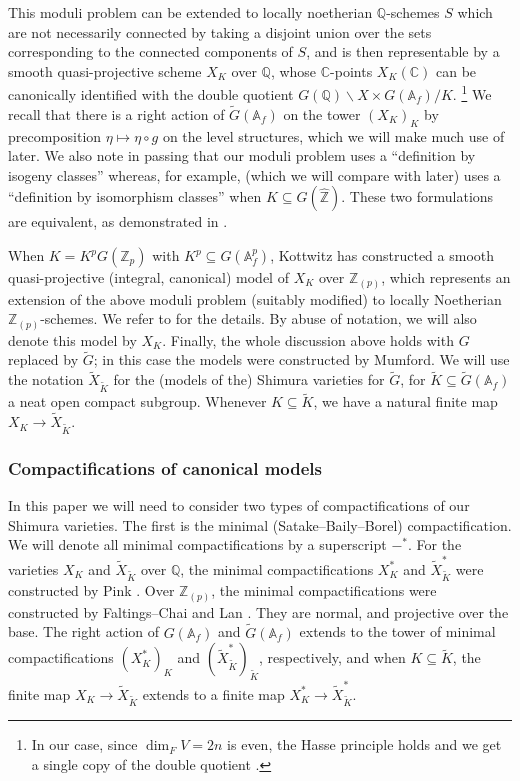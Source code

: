 \documentclass{amsart}
\theoremstyle{remark}
\numberwithin{equation}{subsection}
\newcommand{\A}{\AA}
\newcommand{\Q}{\QQ}
\newcommand{\Z}{\ZZ}
\renewcommand{\AA}{{\mathbb A}}
\newcommand{\CC}{{\mathbb C}}
\newcommand{\QQ}{{\mathbb Q}}
\newcommand{\ZZ}{{\mathbb Z}}
\newcommand{\Zp}{\Z_p}
\newcommand{\tG}{\widetilde{G}}
\newcommand{\tK}{{\widetilde{K}}}
\newcommand{\wt}{\widetilde}
\newcommand{\sub}{\subseteq}
\renewcommand{\(}{\left(}
\renewcommand{\)}{\right)}
\begin{document}
\medskip

This moduli problem can be extended to locally noetherian $\Q$-schemes $S$ which are not necessarily connected by taking a disjoint union over the sets corresponding to the connected components of $S$, and is then representable by a smooth quasi-projective scheme $X_K$ over $\QQ$, whose $\CC$-points $X_K(\CC)$ can be canonically identified with the double quotient $G(\QQ) \backslash X \times G(\AA_f) / K$.%
\footnote{In our case, since $\dim_F V =2n$ is even, the Hasse principle holds and we get a single copy of the
double quotient \cite[\S 7]{kottwitz-shimura}.} We recall that there is a right action of $\tG(\A_f)$ on the tower $(X_K)_K$
by precomposition $\eta\mapsto \eta\circ g$ on the level structures, which we will make much use of later. We also note in passing that our moduli problem uses a ``definition by isogeny classes'' \cite[\S 1.4.2]{lan-thesis} whereas, for example, \cite{scholze-galois} (which we will compare with later) uses a ``definition by isomorphism classes'' \cite[\S 1.4.1]{lan-thesis} when $K \sub G(\widehat{\Z})$. These two formulations are equivalent, as demonstrated in \cite[\S 1.4.3]{lan-thesis}.

\medskip 

When $K=K^p G(\Zp)$ with $K^p \sub G(\A_f^p)$, Kottwitz has constructed a smooth quasi-projective (integral, canonical) model of $X_K$ over $\Z_{(p)}$, which represents an extension of the above moduli problem (suitably modified) to locally Noetherian $\Z_{(p)}$-schemes. We refer to \cite[\S 5]{kottwitz-shimura} for the details. By abuse of notation, we will also denote this model by $X_K$. Finally, the whole discussion above holds with $G$ replaced by $\tG$; in this case the models were constructed by Mumford. We will use the notation $\wt{X}_{\tK}$ for the (models of the) Shimura varieties for $\tG$, for $\tK \sub \tG(\A_f)$ a neat open compact subgroup. Whenever $K \sub \tK$, we have a natural finite map $X_K \to \wt{X}_{\tK}$.

\subsubsection{Compactifications of canonical models}
In this paper we will need to consider two types of compactifications of our Shimura varieties. The first is the minimal (Satake--Baily--Borel) compactification. We will denote all minimal compactifications by a superscript $-^\ast$. For the varieties $X_K$ and $\wt{X}_{\tK}$ over $\Q$, the minimal compactifications $X_K^\ast$ and $\wt{X}_{\tK}^\ast$ were constructed by Pink \cite{pink-thesis}. Over $\Z_{(p)}$, the minimal compactifications were constructed by Faltings--Chai \cite{faltings-chai} and Lan \cite{lan-thesis}. They are normal, and projective over the base. The right action of $G(\A_f)$ and $\tG(\A_f)$ extends to the tower of minimal compactifications $(X^\ast_K)_K$ and $(\wt{X}^\ast_{\tK})_{\tK}$, respectively, and when $K \sub \tK$, the finite map $X_K \to \wt{X}_{\tK}$ extends to a finite map $X_K^\ast \to \wt{X}_{\tK}^\ast$.
\end{document}
